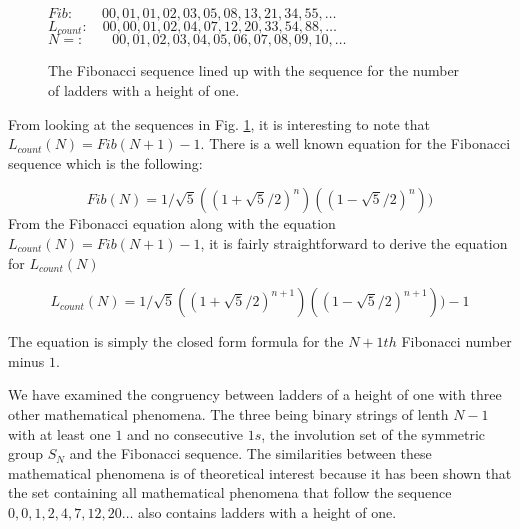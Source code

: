 \begin{figure}[!htp]
    \centering
    $Fib: \qquad 00,01,01,02,03,05,08,13,21,34,55, \dots$\newline
    $L_{count}: \quad   00,00,01,02,04,07,12,20,33,54,88, \dots$\newline
    $ N=: \qquad   00,01,02,03,04,05,06,07,08,09,10, \dots$\newline
    \caption{The Fibonacci sequence lined up with the sequence for the number of ladders with a height of one.}
    \label{Fig:FibLadderSequence}

\end{figure}

From looking at the sequences in Fig. \ref{Fig:FibLadderSequence}, it is interesting to note that\newline 
\small{$L_{count}(N)=Fib(N+1)-1$}.
 There is a well known equation for the Fibonacci sequence which is the following: 

\begin{equation*}
   Fib(N)=1/\sqrt{5}((1+\sqrt{5}/2)^{n})((1-\sqrt{5}/2)^{n}))
\end{equation*}\cite{A12}
From the Fibonacci equation along with the equation $L_{count}(N)=Fib(N+1)-1$, it is fairly straightforward to derive the 
equation for $L_{count}(N)$
\begin{center}
\begin{equation*}
    L_{count}(N)=1/\sqrt{5} ((1+\sqrt{5}/2)^{n+1})((1-\sqrt{5}/2)^{n+1}))-1
\end{equation*}
\end{center}
The equation is simply the closed form formula for the $N+1th$ Fibonacci number minus $1$.\par 

We have examined the congruency between ladders of a height of one with three other mathematical phenomena. The three being 
binary strings of lenth $N-1$ with at least one $1$ and no consecutive $1s$, the involution set of the symmetric group $S_{N}$
and the Fibonacci sequence. The similarities between these mathematical phenomena is of theoretical interest because it has been 
shown that the set containing all mathematical phenomena that follow the sequence $0,0,1,2,4,7,12,20\dots$ also contains 
ladders with a height of one.



